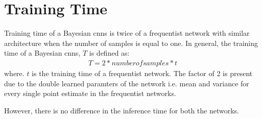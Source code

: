 \section{Training Time}

Training time of a Bayesian \acp{cnn} is twice of a frequentist network with similar architecture when the number of samples is equal to one. In general, the training time of a Bayesian \acp{cnn}, $T$ is defined as:
\begin{align}
T = 2 * number of samples * t
\end{align}
where. $t$ is the training time of a frequentist network. 
The factor of 2 is present due to the double learned paramters of the network i.e. mean and variance for every single point estimate in the frequentist networks.

However, there is no difference in the inference time for both the networks. 


\ifpdf
    \graphicspath{{Chapter2/Figs/Raster/}{Chapter2/Figs/PDF/}{Chapter2/Figs/}}
\else
    \graphicspath{{Chapter2/Figs/Vector/}{Chapter2/Figs/}}
\fi


